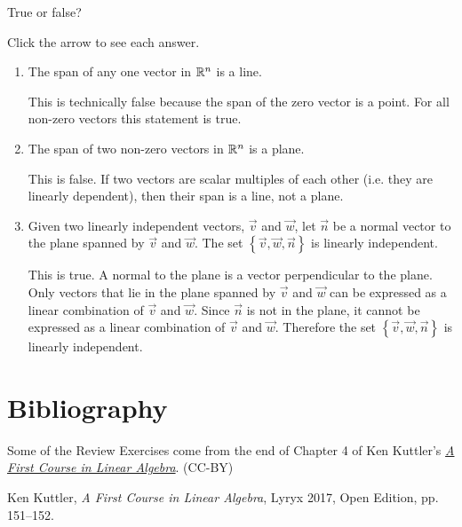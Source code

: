 \documentclass{ximera}
\begin{document}
\begin{problem}\label{prob:solvedCh2_3}
    True or false?

    Click the arrow to see each answer.

    \begin{enumerate}
        \item The span of any one vector in $\mathbb{R}^n$ is a line.

        \begin{expandable}{}{}
            This is technically false because the span of the zero vector is a point.  For all non-zero vectors this statement is true.
        \end{expandable}

        \item The span of two non-zero vectors in $\mathbb{R}^n$ is a plane.

        \begin{expandable}{}{}
            This is false.  If two vectors are scalar multiples of each other (i.e. they are linearly dependent), then their span is a line, not a plane.
        \end{expandable}

        \item Given two linearly independent vectors, $\vec{v}$ and $\vec{w}$, let $\vec{n}$ be a normal vector to the plane spanned by $\vec{v}$ and $\vec{w}$.  The set $\left\{\vec{v}, \vec{w}, \vec{n}\right\}$ is linearly independent.

        \begin{expandable}{}{}
            This is true.  A normal to the plane is a vector perpendicular to the plane.  Only vectors that lie in the plane spanned by $\vec{v}$ and $\vec{w}$ can be expressed as a linear combination of $\vec{v}$ and $\vec{w}$.  Since $\vec{n}$ is not in the plane, it cannot be expressed as a linear combination of $\vec{v}$ and $\vec{w}$.  Therefore the set $\left\{\vec{v}, \vec{w}, \vec{n}\right\}$ is linearly independent.
        \end{expandable}
    \end{enumerate}
\end{problem}

\section*{Bibliography}
Some of the Review Exercises come from the end of Chapter 4 of Ken Kuttler's \href{https://open.umn.edu/opentextbooks/textbooks/a-first-course-in-linear-algebra-2017}{\it A First Course in Linear Algebra}. (CC-BY)

Ken Kuttler, {\it  A First Course in Linear Algebra}, Lyryx 2017, Open Edition, pp. 151--152.
\end{document}
